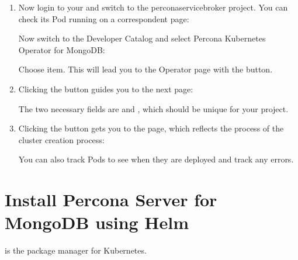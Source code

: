 \documentclass[letterpaper,10pt,english]{sphinxmanual}
\begin{document}
\begin{enumerate}
\item {} 
Now login to your  and switch to the percona\sphinxhyphen{}service\sphinxhyphen{}broker project. You can check its Pod running on a correspondent page:


Now switch to the Developer Catalog and select Percona Kubernetes Operator
for MongoDB:


Choose  item.
This will lead you to the Operator page with the 
button.

\item {} 
Clicking the  button guides you to the next page:


The two necessary fields are  and ,
which should be unique for your project.

\item {} 
Clicking the  button gets you to the  page, which reflects
the process of the cluster creation process:


You can also track Pods to see when they are deployed and track any errors.

\end{enumerate}


\chapter{Install Percona Server for MongoDB using Helm}
\label{\detokenize{helm:install-percona-server-for-mongodb-using-helm}}\label{\detokenize{helm:install-helm}}\label{\detokenize{helm::doc}}
 is the package manager for Kubernetes.
\end{document}
